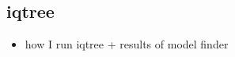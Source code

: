 \subsection{iqtree}

\begin{itemize}
	\item how I run iqtree + results of model finder
\end{itemize}

